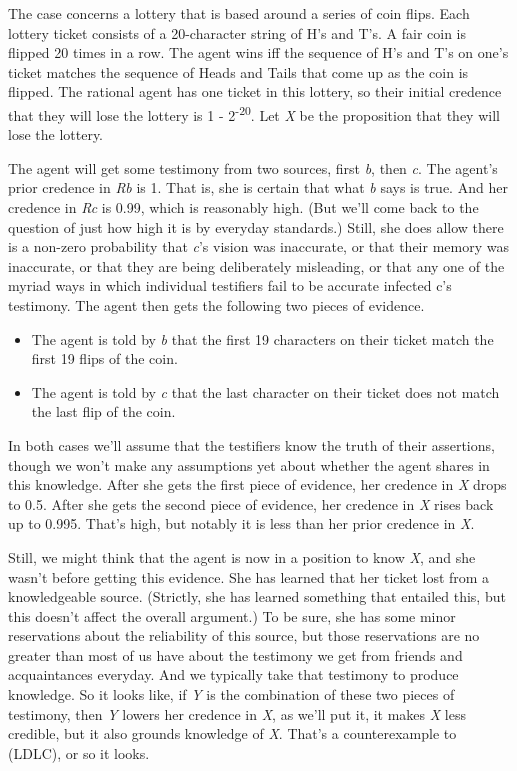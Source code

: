 \documentclass[
  11pt,
  letterpaper,
  DIV=11,
  numbers=noendperiod,
  twoside]{scrartcl}
\providecommand{\tightlist}{%
  \setlength{\itemsep}{0pt}\setlength{\parskip}{0pt}}
\begin{document}
The case concerns a lottery that is based around a series of coin flips.
Each lottery ticket consists of a 20-character string of H's and T's. A
fair coin is flipped 20 times in a row. The agent wins iff the sequence
of H's and T's on one's ticket matches the sequence of Heads and Tails
that come up as the coin is flipped. The rational agent has one ticket
in this lottery, so their initial credence that they will lose the
lottery is 1 - 2\textsuperscript{-20}. Let \emph{X} be the proposition
that they will lose the lottery.

The agent will get some testimony from two sources, first \emph{b}, then
\emph{c}. The agent's prior credence in \emph{Rb} is 1. That is, she is
certain that what \emph{b} says is true. And her credence in \emph{Rc}
is 0.99, which is reasonably high. (But we'll come back to the question
of just how high it is by everyday standards.) Still, she does allow
there is a non-zero probability that \emph{c}'s vision was inaccurate,
or that their memory was inaccurate, or that they are being deliberately
misleading, or that any one of the myriad ways in which individual
testifiers fail to be accurate infected c's testimony. The agent then
gets the following two pieces of evidence.

\begin{itemize}
\tightlist
\item
  The agent is told by \emph{b} that the first 19 characters on their
  ticket match the first 19 flips of the coin.
\item
  The agent is told by \emph{c} that the last character on their ticket
  does not match the last flip of the coin.
\end{itemize}

In both cases we'll assume that the testifiers know the truth of their
assertions, though we won't make any assumptions yet about whether the
agent shares in this knowledge. After she gets the first piece of
evidence, her credence in \emph{X} drops to 0.5. After she gets the
second piece of evidence, her credence in \emph{X} rises back up to
0.995. That's high, but notably it is less than her prior credence in
\emph{X}.

Still, we might think that the agent is now in a position to know
\emph{X}, and she wasn't before getting this evidence. She has learned
that her ticket lost from a knowledgeable source. (Strictly, she has
learned something that entailed this, but this doesn't affect the
overall argument.) To be sure, she has some minor reservations about the
reliability of this source, but those reservations are no greater than
most of us have about the testimony we get from friends and
acquaintances everyday. And we typically take that testimony to produce
knowledge. So it looks like, if \emph{Y} is the combination of these two
pieces of testimony, then \emph{Y} lowers her credence in \emph{X}, as
we'll put it, it makes \emph{X} less credible, but it also grounds
knowledge of \emph{X}. That's a counterexample to (LDLC), or so it
looks.
\end{document}
